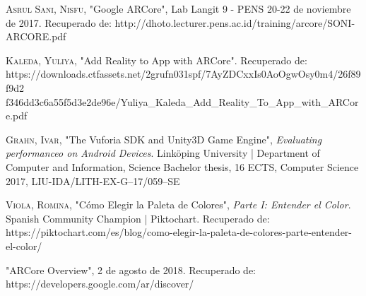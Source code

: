 \begin{thebibliography}{X}
	 \textsc{Asrul Sani, Nisfu}, "Google ARCore", Lab Langit 9 - PENS 20-22 de noviembre de 2017. Recuperado de: http://dhoto.lecturer.pens.ac.id/training/arcore/SONI-ARCORE.pdf
	
	 \textsc{Kaleda, Yuliya}, "Add Reality to App with ARCore". Recuperado de: https://downloads.ctfassets.net/2grufn031spf/7AyZDCxxIs0AoOgwOsy0m4/26f89f9d2
	f346dd3c6a55f5d3e2de96e/Yuliya\_Kaleda\_Add\_Reality\_To\_App\_with\_ARCore.pdf
	
	 \textsc{Grahn, Ivar}, "The Vuforia SDK and Unity3D Game Engine", \textit{Evaluating performanceo on Android Devices}. Linköping University | Department of Computer and Information, Science Bachelor thesis, 16 ECTS, Computer Science 2017, LIU-IDA/LITH-EX-G–17/059–SE
	
	 \textsc{Viola, Romina}, "Cómo Elegir la Paleta de Colores", \textit{Parte I: Entender el Color}. Spanish Community Champion | Piktochart. Recuperado de: https://piktochart.com/es/blog/como-elegir-la-paleta-de-colores-parte-entender-el-color/
	
	 "ARCore Overview", 2 de agosto de 2018. Recuperado de: https://developers.google.com/ar/discover/
	
	
\end{thebibliography}
